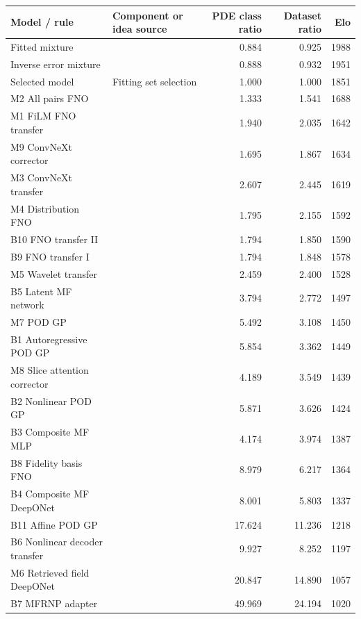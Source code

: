\begin{tabular}{llrrr}
\toprule
Model / rule & Component or idea source & PDE class ratio & Dataset ratio & Elo \\
\midrule
Fitted mixture & \citep{breiman1996} & 0.884 & 0.925 & 1988 \\
Inverse error mixture & \citep{goel2007} & 0.888 & 0.932 & 1951 \\
Selected model & Fitting set selection & 1.000 & 1.000 & 1851 \\
M2 All pairs FNO & \citep{li2021fno,herde2024} & 1.333 & 1.541 & 1688 \\
M1 FiLM FNO transfer & \citep{li2021fno,perez2018} & 1.940 & 2.035 & 1642 \\
M9 ConvNeXt corrector & \citep{liu2022convnext} & 1.695 & 1.867 & 1634 \\
M3 ConvNeXt transfer & \citep{liu2022convnext} & 2.607 & 2.445 & 1619 \\
M4 Distribution FNO & \citep{yu2026fire} & 1.795 & 2.155 & 1592 \\
B10 FNO transfer II & \citep{lyu2023} & 1.794 & 1.850 & 1590 \\
B9 FNO transfer I & \citep{lyu2023} & 1.794 & 1.848 & 1578 \\
M5 Wavelet transfer & \citep{tripura2022wno} & 2.459 & 2.400 & 1528 \\
B5 Latent MF network & \citep{li2022dmfal} & 3.794 & 2.772 & 1497 \\
M7 POD GP & \citep{higdon2008} & 5.492 & 3.108 & 1450 \\
B1 Autoregressive POD GP & \citep{kennedy2000} & 5.854 & 3.362 & 1449 \\
M8 Slice attention corrector & \citep{wu2024transolver} & 4.189 & 3.549 & 1439 \\
B2 Nonlinear POD GP & \citep{perdikaris2017} & 5.871 & 3.626 & 1424 \\
B3 Composite MF MLP & \citep{meng2020} & 4.174 & 3.974 & 1387 \\
B8 Fidelity basis FNO & \citep{li2022ifc} & 8.979 & 6.217 & 1364 \\
B4 Composite MF DeepONet & \citep{howard2023} & 8.001 & 5.803 & 1337 \\
B11 Affine POD GP & \citep{zhang2018} & 17.624 & 11.236 & 1218 \\
B6 Nonlinear decoder transfer & \citep{seidman2022} & 9.927 & 8.252 & 1197 \\
M6 Retrieved field DeepONet & \citep{lu2022mf} & 20.847 & 14.890 & 1057 \\
B7 MFRNP adapter & \citep{niu2024} & 49.969 & 24.194 & 1020 \\
\bottomrule
\end{tabular}
